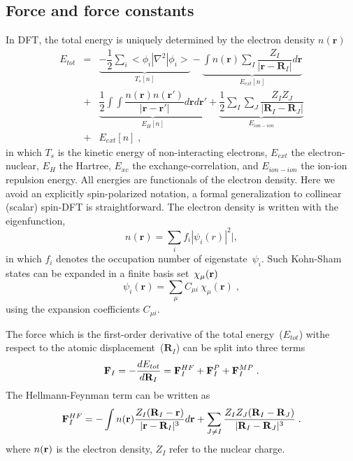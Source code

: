 \documentclass[journal=jpca,manuscript=article]{achemso}
\renewcommand{\vec}[1]{{\bf #1}}
\begin{document}
\subsection{Force and force constants}
\label{sec:FC_fixed}
In DFT, the total energy is uniquely determined by the electron density $n(\mathbf{r})$  
\begin{eqnarray} 
  E_{tot}     & = & \underbrace{-\dfrac{1}{2}\sum_{i}<\phi_i|\nabla^2|\phi_i> }_{T_{s}[n]}     -  \underbrace{ \int {n(\mathbf{r})  \sum_{I}\dfrac{Z_{I}}{|\mathbf{r}-\mathbf{R}_{I}|}  d\mathbf{r}} }_{ E_{ext}[n]}  \nonumber   \\  
  & + & \underbrace{ \dfrac{1}{2}\int \int {\dfrac{n(\mathbf{r}) n(\mathbf{r'}) }{|\mathbf{r}-\mathbf{r'} |}  d\mathbf{r}  d\mathbf{r'}} }_{E_{H}[n]}  +   \underbrace{ \dfrac{1}{2}\sum_{I}\sum_{J}{\dfrac{Z_{I} Z_{J}}{|\mathbf{R}_{I}-\mathbf{R}_{J} |} }    }_{E_{ion-ion}} \nonumber   \\
  & + & E_{ext}[n] \;,
\label{eq:KSTOT}
\end{eqnarray}
in which $T_{s}$ is the kinetic energy of non-interacting electrons, $E_{ext}$ the electron-nuclear, $E_H$ the Hartree, $E_{xc}$ the exchange-correlation, and $E_{ion-ion}$ the ion-ion repulsion energy. All energies are functionals of the electron density. Here we avoid an explicitly spin-polarized notation, a formal generalization to collinear (scalar) spin-DFT is straightforward. 
The electron density is written with the eigenfunction,
\begin{equation}
n(\mathbf{r})=\sum_i f_i |\psi_i(r)|^2|,
\end{equation}
in which $f_i$ denotes the occupation number of eigenstate~$\psi_i$. Such
Kohn-Sham states can be expanded in a finite basis set~$\chi_\mu(\vec{r})$
\begin{equation}
\psi_i(\mathbf{r})=\sum_{\mu}C_{\mu i} \: \chi_{\mu}(\mathbf{r})\;,
\label{eq:expansion}
\end{equation}
using the expansion coefficients $C_{\mu i}$.

The force which is the first-order derivative of the total energy~($E_{tot}$) withe respect to the atomic displacement~($\mathbf{R}_{I}$) can be split into three terms 
\begin{equation}
\vec{F}_I = -\dfrac{d E_{tot}}{d \mathbf{R}_{I}} = \vec{F}_I^{HF} + \vec{F}_I^{P} + \vec{F}_I^{MP}\;.
\label{eq:forces}
\end{equation}
The Hellmann-Feynman term can be written as  
\begin{equation}
\vec{F}_I^{HF}=-\int {n(\mathbf{r})  \dfrac{Z_{I}(\mathbf{R}_{I}-\mathbf{r}  )  }{|\mathbf{r}-\mathbf{R}_{I}|^3}  d\mathbf{r}}  +
\sum_{J\ne I}{\dfrac{Z_{I} Z_{J} (\mathbf{R}_{I}-\mathbf{R}_{J})}{|\mathbf{R}_{I}-\mathbf{R}_{J} |^3} }\;.
\label{eq:F_HF_use} 
\end{equation}
where $n(\vec{r})$ is the electron density, $Z_{I}$ refer to the nuclear charge. 
\end{document}
